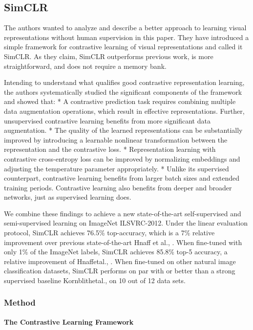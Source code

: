\documentclass[
]{krantz}
\begin{document}
\hypertarget{simclr}{%
\subsection{SimCLR}\label{simclr}}

The authors wanted to analyze and describe a better approach to learning visual representations without human supervision in this paper. They have introduced a simple framework for contrastive learning of visual representations and called it SimCLR. As they claim, SimCLR outperforms previous work, is more straightforward, and does not require a memory bank.

Intending to understand what qualifies good contrastive representation learning, the authors systematically studied the significant components of the framework and showed that:
* A contrastive prediction task requires combining multiple data augmentation operations, which result in effective representations. Further, unsupervised contrastive learning benefits from more significant data augmentation.
* The quality of the learned representations can be substantially improved by introducing a learnable nonlinear transformation between the representation and the contrastive loss.
* Representation learning with contrastive cross-entropy loss can be improved by normalizing embeddings and adjusting the temperature parameter appropriately.
* Unlike its supervised counterpart, contrastive learning benefits from larger batch sizes and extended training periods. Contrastive learning also benefits from deeper and broader networks, just as supervised learning does.

We combine these findings to achieve a new state-of-the-art self-supervised and semi-supervised learning on ImageNet ILSVRC-2012. Under the linear evaluation protocol, SimCLR achieves 76.5\% top-accuracy, which is a 7\% relative improvement over previous state-of-the-art Hnaff et al., . When fine-tuned with only 1\% of the ImageNet labels, SimCLR achieves 85.8\% top-5 accuracy, a relative improvement of Hnaffetal., . When fine-tuned on other natural image classification datasets, SimCLR performs on par with or better than a strong supervised baseline Kornblithetal., on 10 out of 12 data sets.

\hypertarget{method}{%
\subsubsection{Method}\label{method}}

\hypertarget{the-contrastive-learning-framework}{%
\paragraph{The Contrastive Learning Framework}\label{the-contrastive-learning-framework}}
\end{document}
